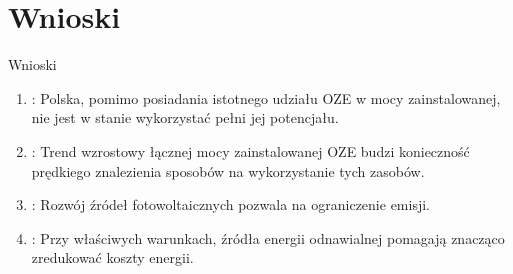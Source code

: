 \section{Wnioski}

\begin{frame}{Wnioski}
    \begin{enumerate}
        \item<1-> : Polska, pomimo posiadania istotnego udziału OZE w mocy zainstalowanej, nie jest w stanie wykorzystać pełni jej potencjału.
        \item<2-> : Trend wzrostowy łącznej mocy zainstalowanej OZE budzi konieczność prędkiego znalezienia sposobów na wykorzystanie tych zasobów.
        \item<3-> : Rozwój źródeł fotowoltaicznych pozwala na ograniczenie emisji.
        \item<4-> : Przy właściwych warunkach, źródła energii odnawialnej pomagają znacząco zredukować koszty energii.
    \end{enumerate}
\end{frame}